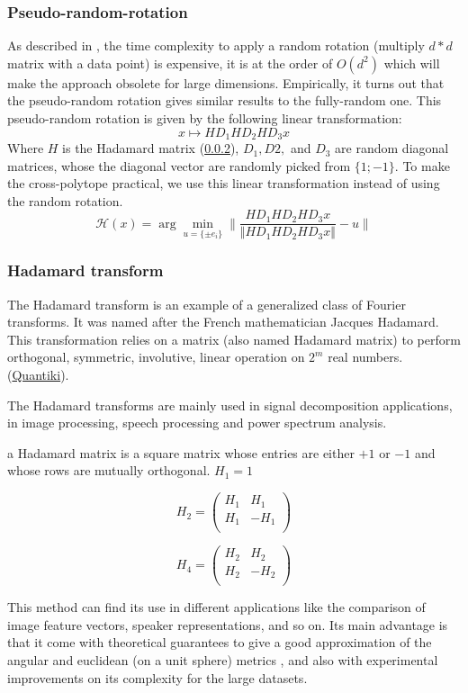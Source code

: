 \subsubsection{Pseudo-random-rotation}
As described in \citep{andoni_practicalsh_2015}, the time complexity to apply a
random rotation (multiply $d * d$ matrix with a data point) is expensive, it is
at the order of $O(d^2)$ which will make the approach obsolete for large
dimensions. Empirically, it turns out that the pseudo-random rotation gives
similar results to the fully-random one. This pseudo-random rotation is given by
the following linear transformation:
$$
    x \mapsto HD_1HD_2HD_3x
$$
Where $H$ is the Hadamard matrix (\ref{subsubsect:hadamard_transform}), $D_1, D2,$
and $D_3$ are random diagonal matrices, whose the diagonal vector are randomly
picked from $\lbrace 1; -1 \rbrace$. To make the cross-polytope practical, we
use this linear transformation instead of using the random rotation.
$$
    \mathcal{H}(x) = \arg \min_{u = \lbrace \pm e_i \rbrace} \lVert \frac{HD_1HD_2HD_3x}{\Vert{HD_1HD_2HD_3x} \Vert} - u \rVert
$$

\subsubsection{Hadamard transform}
\label{subsubsect:hadamard_transform}
The Hadamard transform is an example of a generalized class of Fourier
transforms. It was named after the French mathematician Jacques Hadamard. This
transformation relies on a matrix (also named Hadamard matrix) to perform
orthogonal, symmetric, involutive, linear operation on $2^m$ real numbers.
(\href{https://www.quantiki.org/wiki/hadamard}{Quantiki}).

The Hadamard transforms are mainly used in signal decomposition applications, in
image processing, speech processing and power spectrum analysis.

a Hadamard matrix is a square matrix whose entries are either $+1$ or $-1$ and whose
rows are mutually orthogonal. $H_1 = 1$

$$
    H_2 =
    \begin{pmatrix}
        H_1 & H_1   \\
        H_1 & - H_1 \\
    \end{pmatrix}
$$

$$
    H_4 =
    \begin{pmatrix}
        H_2 & H_2   \\
        H_2 & - H_2 \\
    \end{pmatrix}
$$

This method can find its use in different applications like the comparison of
image feature vectors, speaker representations, and so on. Its main advantage is
that it come with theoretical guarantees to give a good approximation of the
angular and euclidean (on a unit sphere) metrics , and also with experimental
improvements on its complexity for the large datasets.
\citep{andoni_practicalsh_2015}
